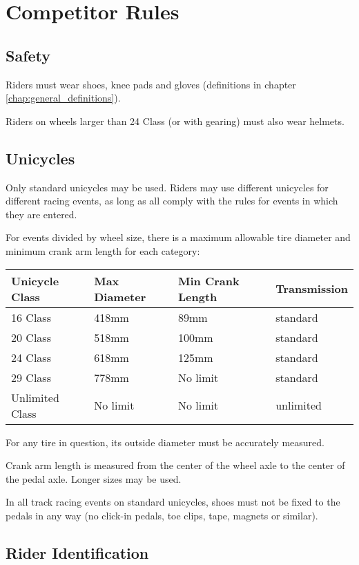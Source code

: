 \chapter{Competitor Rules}

\section{Safety}

Riders must wear shoes, knee pads and gloves (definitions in chapter \ref{chap:general_definitions}).

Riders on wheels larger than 24 Class (or with gearing) must also wear helmets.

\section{Unicycles}

Only standard unicycles may be used.
Riders may use different unicycles for different racing events, as long as all comply with the rules for events in which they are entered.

For events divided by wheel size, there is a maximum allowable tire diameter and minimum crank arm length for each category:

\begin{longtable}{|p{3cm}|p{3cm}|p{4cm}|p{3cm}|}
\hline
\textbf{Unicycle Class} & \textbf{Max Diameter} & \textbf{Min Crank Length} & \textbf{Transmission}\\
\hline
16 Class & 418mm & 89mm & standard \\
\hline
20 Class & 518mm & 100mm & standard \\
\hline
24 Class & 618mm & 125mm & standard \\
\hline
29 Class & 778mm & No limit & standard \\
\hline
Unlimited Class & No limit & No limit & unlimited \\
\hline
\end{longtable}

For any tire in question, its outside diameter must be accurately measured.

Crank arm length is measured from the center of the wheel axle to the center of the pedal axle.
Longer sizes may be used.

In all track racing events on standard unicycles, shoes must not be fixed to the pedals in any way (no click-in pedals, toe clips, tape, magnets or similar).

\section{Rider Identification}

